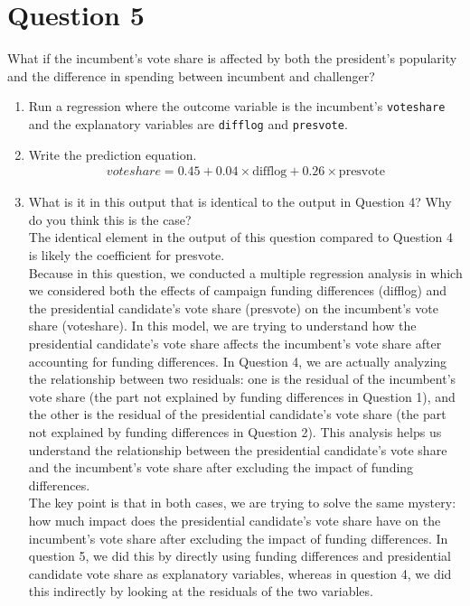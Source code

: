 \documentclass[12pt,letterpaper]{article}
\begin{document}
\section*{Question 5}
\noindent What if the incumbent's vote share is affected by both the president's popularity and the difference in spending between incumbent and challenger? 
	\begin{enumerate}
		\item Run a regression where the outcome variable is the incumbent's \texttt{voteshare} and the explanatory variables are \texttt{difflog} and \texttt{presvote}.		
		\item Write the prediction equation.		
		\begin{align*}
			voteshare = 0.45 + 0.04 \times \text{difflog} + 0.26\times \text{presvote}
		\end{align*}
		\item What is it in this output that is identical to the output in Question 4? Why do you think this is the case?
		\vspace{.15cm}
		\noindent
		    \\The identical element in the output of this question  compared to Question 4 is likely the coefficient for presvote.\\
        	Because in this question, we conducted a multiple regression analysis in which we considered both the effects of campaign funding differences (difflog) and the presidential candidate's vote share (presvote) on the incumbent's vote share (voteshare). In this model, we are trying to understand how the presidential candidate's vote share affects the incumbent's vote share after accounting for funding differences. In Question 4, we are actually analyzing the relationship between two residuals: one is the residual of the incumbent's vote share (the part not explained by funding differences in Question 1), and the other is the residual of the presidential candidate's vote share (the part not explained by funding differences in Question 2). This analysis helps us understand the relationship between the presidential candidate's vote share and the incumbent's vote share after excluding the impact of funding differences.\\
        	The key point is that in both cases, we are trying to solve the same mystery: how much impact does the presidential candidate's vote share have on the incumbent's vote share after excluding the impact of funding differences. In question 5, we did this by directly using funding differences and presidential candidate vote share as explanatory variables, whereas in question 4, we did this indirectly by looking at the residuals of the two variables.\\

\end{enumerate}
\end{document}
